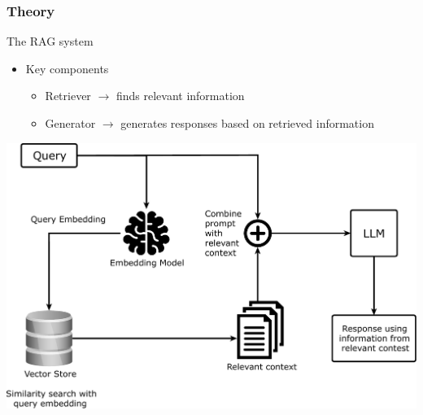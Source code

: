 \documentclass[handout]{beamer}\mode<handout>{\usetheme{AMSBolognaFC}}
\begin{document}
\begin{frame}[allowframebreaks]
\frametitle{Theory}
    \begin{block}{The RAG system}
        \vfill
        \begin{itemize}
            \item Key components
            \begin{itemize}
                \item \alert{Retriever} $\rightarrow$ finds relevant information
                \item \alert{Generator} $\rightarrow$ generates responses based on retrieved information
            \end{itemize}
        \end{itemize}
    \end{block}
    \vfill
    \centering
    \includegraphics[width=.6\textwidth]{figures/rag-architecture}
    \vfill

    \framebreak


\end{frame}
\end{document}
